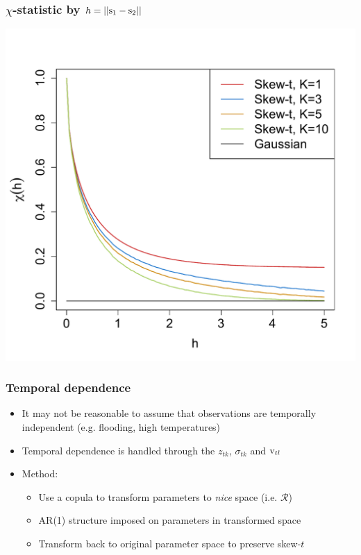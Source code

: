 \documentclass{beamer}
\renewcommand{\bs}{ \mbox{\boldmath s}}
\newcommand{\bv}{ \mbox{\boldmath v}}
\newcommand{\skewt}{skew-$t$ }
\newcommand{\bit}{\begin{itemize}}
\newcommand{\eit}{\end{itemize}}
\begin{document}
\begin{frame}\frametitle{$\chi$-statistic by $h=||\bs_1-\bs_2||$}
 \begin{center}
  \includegraphics[height=0.8\textheight]{plots/chi-h}
 \end{center}
\end{frame}

\begin{frame}\frametitle{Temporal dependence}
  \bit\setlength\itemsep{1em}
    \item It may not be reasonable to assume that observations are temporally independent (e.g. flooding, high temperatures)
    \item Temporal dependence is handled through the $z_{tk}$, $\sigma_{tk}$ and $\bv_{tl}$
    \item Method:
    \bit\setlength\itemsep{0.5em}
      \item Use a copula to transform parameters to \emph{nice} space (i.e. $\mathcal{R}$)
      \item AR(1) structure imposed on parameters in transformed space
      \item Transform back to original parameter space to preserve \skewt
    \eit
  \eit
\end{frame}
\end{document}
